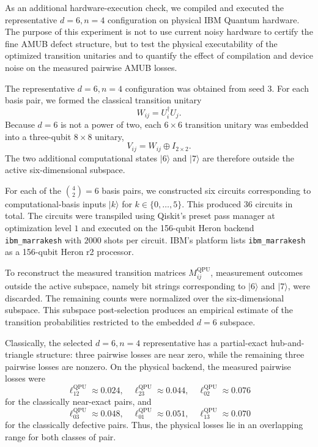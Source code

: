 \documentclass[a4paper,twocolumn,11pt,amsfonts,amssymb]{quantumarticle}
\begin{document}
As an additional hardware-execution check, we compiled and executed the representative \(d=6,n=4\) configuration on physical IBM Quantum hardware. The purpose of this experiment is not to use current noisy hardware to certify the fine AMUB defect structure, but to test the physical executability of the optimized transition unitaries and to quantify the effect of compilation and device noise on the measured pairwise AMUB losses.

The representative \(d=6,n=4\) configuration was obtained from seed \(3\). For each basis pair, we formed the classical transition unitary
\[
W_{ij}=U_i^\dagger U_j.
\]
Because \(d=6\) is not a power of two, each \(6\times 6\) transition unitary was embedded into a three-qubit \(8\times 8\) unitary,
\[
V_{ij}=W_{ij}\oplus I_{2\times 2}.
\]
The two additional computational states \(|6\rangle\) and \(|7\rangle\) are therefore outside the active six-dimensional subspace.

For each of the \(\binom{4}{2}=6\) basis pairs, we constructed six circuits corresponding to computational-basis inputs \(|k\rangle\) for \(k\in\{0,\ldots,5\}\). This produced \(36\) circuits in total. The circuits were transpiled using Qiskit's preset pass manager at optimization level \(1\) and executed on the 156-qubit Heron backend \texttt{ibm\_marrakesh} with \(2000\) shots per circuit. IBM's platform lists \texttt{ibm\_marrakesh} as a 156-qubit Heron r2 processor. \cite{IBMQuantumMarrakeshBackend}

To reconstruct the measured transition matrices \(M_{ij}^{\mathrm{QPU}}\), measurement outcomes outside the active subspace, namely bit strings corresponding to \(|6\rangle\) and \(|7\rangle\), were discarded. The remaining counts were normalized over the six-dimensional subspace. This subspace post-selection produces an empirical estimate of the transition probabilities restricted to the embedded \(d=6\) subspace.

Classically, the selected \(d=6,n=4\) representative has a partial-exact hub-and-triangle structure: three pairwise losses are near zero, while the remaining three pairwise losses are nonzero. On the physical backend, the measured pairwise losses were
\[
\ell_{12}^{\mathrm{QPU}}\approx 0.024,\quad
\ell_{23}^{\mathrm{QPU}}\approx 0.044,\quad
\ell_{02}^{\mathrm{QPU}}\approx 0.076
\]
for the classically near-exact pairs, and
\[
\ell_{03}^{\mathrm{QPU}}\approx 0.048,\quad
\ell_{01}^{\mathrm{QPU}}\approx 0.051,\quad
\ell_{13}^{\mathrm{QPU}}\approx 0.070
\]
for the classically defective pairs. Thus, the physical losses lie in an overlapping range for both classes of pair.
\end{document}
